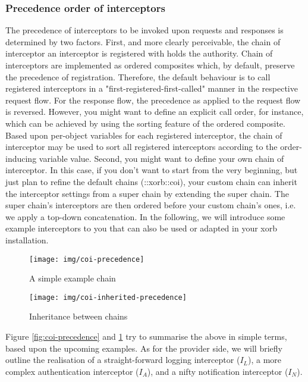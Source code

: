 \subsubsection{Precedence order of interceptors}
The precedence of interceptors to be invoked upon requests and responses is determined by two factors. First, and more clearly perceivable, the chain of interceptor an interceptor is registered with holds the authority. Chain of interceptors are implemented as ordered composites which, by default, preserve the precedence of registration. Therefore, the default behaviour is to call registered interceptors in a "first-registered-first-called" manner in the respective request flow. For the response flow, the precedence as applied to the request flow is reversed. However, you might want to define an explicit call order, for instance, which can be achieved by using the sorting feature of the ordered composite. Based upon per-object variables for each registered interceptor, the chain of interceptor may be used to sort all registered interceptors according to the order-inducing variable value. Second, you might want to define your own chain of interceptor. In this case, if you don't want to start from the very beginning, but just plan to refine the default chains (::xorb::coi), your custom chain can inherit the interceptor settings from a super chain by extending the super chain. The super chain's interceptors are then ordered before your custom chain's ones, i.e. we apply a top-down concatenation.
In the following, we will introduce some example interceptors to you that can also be used or adapted in your xorb installation. 
%
\begin{figure}[hbt]
\centering
\begin{minipage}[]{0.45\textwidth}
\centering
\texttt{[image: img/coi-precedence]}
\caption{A simple example chain}
\end{minipage}
\label{fig:coi-precedence}
\begin{minipage}[]{0.45\textwidth}
\centering
\texttt{[image: img/coi-inherited-precedence]}
\caption{Inheritance between chains}
\end{minipage}
\label{fig:coi-inherited-precedence}
\end{figure}
%
Figure \ref{fig:coi-precedence} and \ref{fig:coi-inherited-precedence} try to summarise the above in simple terms, based upon the upcoming examples. As for the provider side, we will briefly outline the realisation of a straight-forward logging interceptor (\begin{math}I_L\end{math}), a more complex authentication interceptor (\begin{math}I_A\end{math}), and a nifty notification interceptor (\begin{math}I_N\end{math}). 

